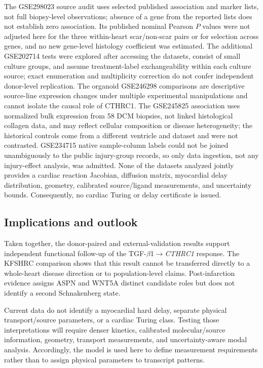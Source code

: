 \documentclass[preprint,11pt]{elsarticle}
\newcommand{\cthrc}{\textit{CTHRC1}}
\newcommand{\tgfb}{TGF-$\beta$1}
\begin{document}
The GSE298023 source audit uses selected published association and marker lists, not full biopsy-level observations; absence of a gene from the reported lists does not establish zero association. Its published nominal Pearson $P$ values were not adjusted here for the three within-heart scar/non-scar pairs or for selection across genes, and no new gene-level histology coefficient was estimated. The additional GSE202714 tests were explored after accessing the datasets, consist of small culture groups, and assume treatment-label exchangeability within each culture source; exact enumeration and multiplicity correction do not confer independent donor-level replication. The organoid GSE246298 comparisons are descriptive source-line expression changes under multiple experimental manipulations and cannot isolate the causal role of CTHRC1. The GSE245825 association uses normalized bulk expression from 58 DCM biopsies, not linked histological collagen data, and may reflect cellular composition or disease heterogeneity; the historical controls come from a different ventricle and dataset and were not contrasted. GSE234715 native sample-column labels could not be joined unambiguously to the public injury-group records, so only data ingestion, not any injury-effect analysis, was admitted. None of the datasets analyzed jointly provides a cardiac reaction Jacobian, diffusion matrix, myocardial delay distribution, geometry, calibrated source/ligand measurements, and uncertainty bounds. Consequently, no cardiac Turing or delay certificate is issued.

\subsection{Implications and outlook}
Taken together, the donor-paired and external-validation results support independent functional follow-up of the \tgfb{}$\rightarrow$\cthrc{} response. The KFSHRC comparison shows that this result cannot be transferred directly to a whole-heart disease direction or to population-level claims. Post-infarction evidence assigns ASPN and WNT5A distinct candidate roles but does not identify a second Schnakenberg state.

Current data do not identify a myocardial hard delay, separate physical transport/source parameters, or a cardiac Turing class. Testing those interpretations will require denser kinetics, calibrated molecular/source information, geometry, transport measurements, and uncertainty-aware modal analysis. Accordingly, the model is used here to define measurement requirements rather than to assign physical parameters to transcript patterns.
\end{document}
